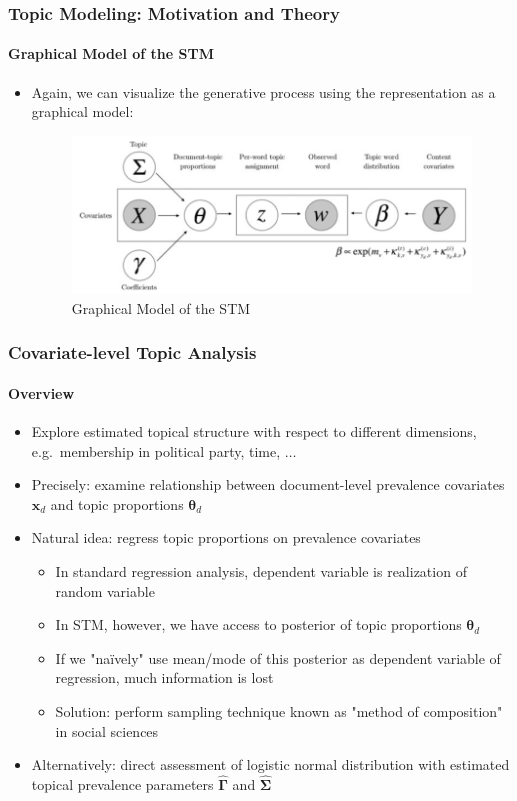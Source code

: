 \documentclass[xcolor=dvipsnames]{beamer}
\begin{document}
\begin{frame}
\frametitle{Topic Modeling: Motivation and Theory}
\framesubtitle{Graphical Model of the STM}
\begin{itemize}
\item Again, we can visualize the generative process using the representation as a graphical model:
\begin{figure}[h!]
\centering
\hspace*{-1cm}\includegraphics[scale = 0.3]{../../plots/presentation/stm_graphical.png}
\caption{Graphical Model of the STM}
\end{figure}
\end{itemize}
\end{frame}

\begin{frame}
\frametitle{Covariate-level Topic Analysis}
\framesubtitle{Overview}
\begin{itemize}
\item Explore estimated topical structure with respect to different dimensions, e.g.\ membership in political party, time, $\dots$
\item Precisely: examine relationship between document-level prevalence covariates $\boldsymbol{x}_d$ and topic proportions $\boldsymbol{\theta}_d$
\item Natural idea: regress topic proportions on prevalence covariates
\begin{itemize}
\item In standard regression analysis, dependent variable is realization of random variable
\item In STM, however, we have access to posterior of topic proportions $\boldsymbol{\theta}_d$
\item If we "na{\"i}vely" use mean/mode of this posterior as dependent variable of regression, much information is lost
\item Solution: perform sampling technique known as "method of composition" in social sciences
\end{itemize}
\item Alternatively: direct assessment of logistic normal distribution with estimated topical prevalence parameters $\hat{\boldsymbol{\Gamma}}$ and $\hat{\boldsymbol{\Sigma}}$
\end{itemize}
\end{frame}
\end{document}
